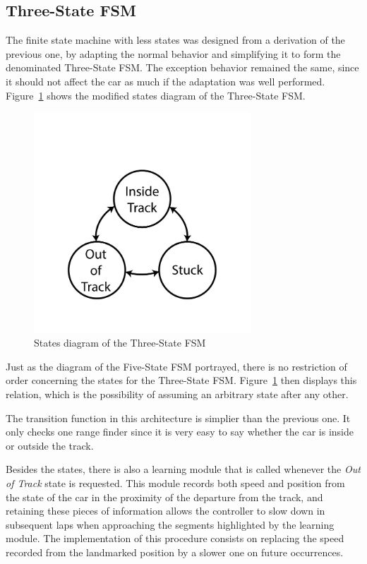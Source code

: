 \subsection{Three-State FSM} \label{subsec:FSM3}
	
	The finite state machine with less states was designed from a derivation of the previous one, by adapting the normal behavior and simplifying it to form the denominated Three-State FSM. The exception behavior remained the same, since it should not affect the car as much if the adaptation was well performed. Figure~\ref{Fig:FSM3Diagram} shows the modified states diagram of the Three-State FSM.
	
	\begin{figure}[h]
		
		\centering
		\includegraphics[width=230pt]{ThreeStateFSM}
		\caption{States diagram of the Three-State FSM}
		\label{Fig:FSM3Diagram}
		
	\end{figure}
	
	Just as the diagram of the Five-State FSM portrayed, there is no restriction of order concerning the states for the Three-State FSM. Figure~\ref{Fig:FSM3Diagram} then displays this relation, which is the possibility of assuming an arbitrary state after any other.
	
	The transition function in this architecture is simplier than the previous one. It only checks one range finder since it is very easy to say whether the car is inside or outside the track.
	
	Besides the states, there is also a learning module that is called whenever the \emph{Out of Track} state is requested. This module records both speed and position from the state of the car in the proximity of the departure from the track, and retaining these pieces of information allows the controller to slow down in subsequent laps when approaching the segments highlighted by the learning module. The implementation of this procedure consists on replacing the speed recorded from the landmarked position by a slower one on future occurrences.
	
